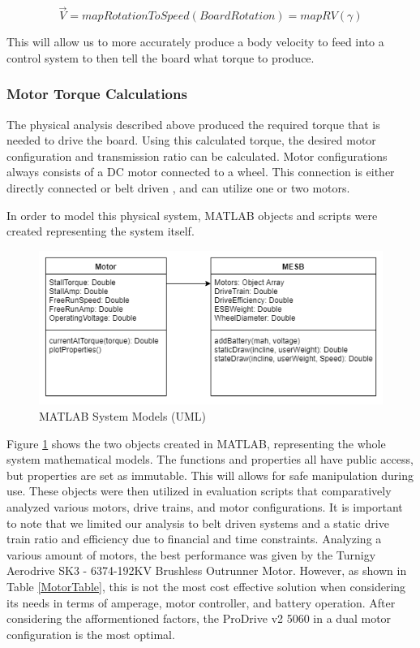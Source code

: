 \documentclass[letterpaper,12pt]{article}
\begin{document}
\begin{equation}
    \vec{V} = mapRotationToSpeed(Board Rotation) = mapRV(\gamma)
\end{equation}

This will allow us to more accurately produce a body velocity to feed into a control system to then tell the board what torque to produce.

\subsubsection{Motor Torque Calculations}
The physical analysis described above produced the required torque that is needed to drive the board. Using this calculated torque, the desired motor configuration and transmission ratio can be calculated. Motor configurations always consists of a DC motor connected to a wheel. This connection is either directly connected \cite{DirectConnect} or belt driven \cite{BeltConnect}, and can utilize one or two motors.

In order to model this physical system, MATLAB objects and scripts were created representing the system itself.

\begin{figure}[h!]
    \centering
    \includegraphics[width=12cm]{MotorSelFigs/UML_BEST.png}
    \caption{MATLAB System Models (UML)}
    \label{MotorUML}
\end{figure}

Figure \ref{MotorUML} shows the two objects created in MATLAB, representing the whole system mathematical models. The functions and properties all have public access, but properties are set as immutable. This will allows for safe manipulation during use. These objects were then utilized in evaluation scripts that comparatively analyzed various motors, drive trains, and motor configurations. It is important to note that we limited our analysis to belt driven systems and a static drive train ratio and efficiency due to financial and time constraints. Analyzing a various amount of motors, the best performance was given by the Turnigy Aerodrive SK3 - 6374-192KV Brushless Outrunner Motor. However, as shown in Table \ref{MotorTable}, this is not the most cost effective solution when considering its needs in terms of amperage, motor controller, and battery operation. After considering the afformentioned factors, the ProDrive v2 5060 in a dual motor configuration is the most optimal.
\end{document}

